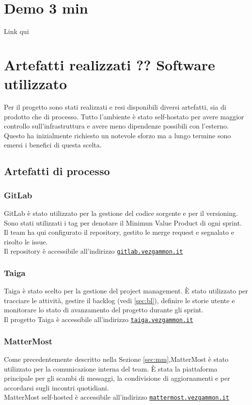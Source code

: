 \documentclass{article}
\begin{document}
\section{Demo 3 min}
Link qui

\section{Artefatti realizzati ?? Software utilizzato}

Per il progetto sono stati realizzati e resi disponibili diversi artefatti, sia di prodotto che di processo. Tutto l'ambiente è stato self-hostato per avere maggior controllo sull'infrastruttura
e avere meno dipendenze possibili con l'esterno. Questo ha inizialmente richiesto un notevole sforzo ma a lungo termine sono emersi i benefici di questa scelta.

\subsection{Artefatti di processo}

\subsubsection{GitLab}
GitLab è stato utilizzato per la gestione del codice sorgente e per il versioning. Sono stati utilizzati i tag per denotare il Minimun Value Product di ogni sprint.
Il team ha qui configurato il repository, gestito le merge request e segnalato e risolto le issue. \\
Il repository è accessibile all'indirizzo \href{https://gitlab.vezgammon.it}{\texttt{gitlab.vezgammon.it}}  

\subsubsection{Taiga}
Taiga è stato scelto per la gestione del project management. È stato utilizzato per tracciare le attività, gestire il backlog (vedi \ref{sec:bl}), definire le storie utente e 
monitorare lo stato di avanzamento del progetto durante gli sprint. \\
Il progetto Taiga è accessibile all'indirizzo \href{https://taiga.vezgammon.it}{\texttt{taiga.vezgammon.it}}

\subsubsection{MatterMost}
Come precedentemente descritto nella Sezione \ref{sec:mm},MatterMost è stato utilizzato per la comunicazione interna del team. È stata la piattaforma principale per gli scambi di messaggi, la condivisione di aggiornamenti 
e per accordarsi sugli incontri quotidiani. \\
MatterMost self-hosted è accessibile all'indirizzo \href{https://mattermost.vezgammon.it}{\texttt{mattermost.vezgammon.it}}
\end{document}
